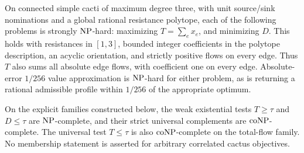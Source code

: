 \begin{theorem}
\label{thm:a-corr-hardness}
On connected simple cacti of maximum degree three, with unit source/sink
nominations and a global rational resistance polytope, each of the
following problems is strongly $\mathrm{NP}$-hard: maximizing
$T=\sum_e x_e$, and minimizing $D$. This holds with resistances in $[1,3]$,
bounded integer coefficients in the polytope description, an acyclic
orientation, and strictly positive flows on every edge. Thus $T$ also
sums all absolute edge flows, with coefficient one on every edge.
Absolute-error $1/256$ value approximation is $\mathrm{NP}$-hard for either
problem, as is returning a rational admissible profile within $1/256$
of the appropriate optimum.

On the explicit families constructed below, the weak existential tests
$T\ge\tau$ and $D\le\tau$ are $\mathrm{NP}$-complete, and their strict universal
complements are $\mathrm{coNP}$-complete. The universal test $T\le\tau$ is also
$\mathrm{coNP}$-complete on the total-flow family. No membership statement is
asserted for arbitrary correlated cactus objectives.
\end{theorem}
